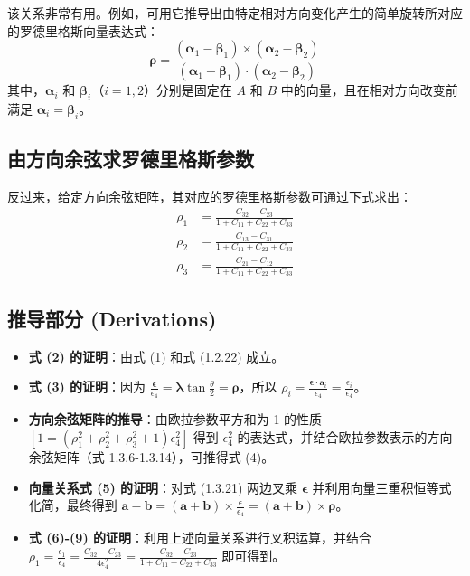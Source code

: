 该关系非常有用。例如，可用它推导出由特定相对方向变化产生的简单旋转所对应的罗德里格斯向量表达式：
\begin{equation}
\boldsymbol{\rho} = \frac{(\boldsymbol{\alpha}_1 - \boldsymbol{\beta}_1) \times (\boldsymbol{\alpha}_2 - \boldsymbol{\beta}_2)}{(\boldsymbol{\alpha}_1 + \boldsymbol{\beta}_1) \cdot (\boldsymbol{\alpha}_2 - \boldsymbol{\beta}_2)} \tag{6}
\end{equation}
其中，\(\boldsymbol{\alpha}_i\) 和 \(\boldsymbol{\beta}_i\)（\(i = 1, 2\)）分别是固定在 \(A\) 和 \(B\) 中的向量，且在相对方向改变前满足 \(\boldsymbol{\alpha}_i = \boldsymbol{\beta}_i\)。

\subsection*{由方向余弦求罗德里格斯参数}
反过来，给定方向余弦矩阵，其对应的罗德里格斯参数可通过下式求出：
\begin{align}
\rho_1 &= \frac{C_{32} - C_{23}}{1 + C_{11} + C_{22} + C_{33}} \tag{7} \\
\rho_2 &= \frac{C_{13} - C_{31}}{1 + C_{11} + C_{22} + C_{33}} \tag{8} \\
\rho_3 &= \frac{C_{21} - C_{12}}{1 + C_{11} + C_{22} + C_{33}} \tag{9}
\end{align}

\subsection*{推导部分 (Derivations)}
\begin{itemize}
    \item \textbf{式 (2) 的证明}：由式 (1) 和式 (1.2.22) 成立。
    \item \textbf{式 (3) 的证明}：因为 \(\frac{\boldsymbol{\epsilon}}{\epsilon_4} = \boldsymbol{\lambda} \tan \frac{\theta}{2} = \boldsymbol{\rho}\)，所以 \(\rho_i = \frac{\boldsymbol{\epsilon} \cdot \mathbf{a}_i}{\epsilon_4} = \frac{\epsilon_i}{\epsilon_4}\)。
    \item \textbf{方向余弦矩阵的推导}：由欧拉参数平方和为 1 的性质 \([1 = (\rho_1^2 + \rho_2^2 + \rho_3^2 + 1)\epsilon_4^2]\) 得到 \(\epsilon_4^2\) 的表达式，并结合欧拉参数表示的方向余弦矩阵（式 1.3.6-1.3.14），可推得式 (4)。
    \item \textbf{向量关系式 (5) 的证明}：对式 (1.3.21) 两边叉乘 \(\boldsymbol{\epsilon}\) 并利用向量三重积恒等式化简，最终得到 \(\mathbf{a} - \mathbf{b} = (\mathbf{a} + \mathbf{b}) \times \frac{\boldsymbol{\epsilon}}{\epsilon_4} = (\mathbf{a} + \mathbf{b}) \times \boldsymbol{\rho}\)。
    \item \textbf{式 (6)-(9) 的证明}：利用上述向量关系进行叉积运算，并结合 \(\rho_1 = \frac{\epsilon_1}{\epsilon_4} = \frac{C_{32} - C_{23}}{4\epsilon_4^2} = \frac{C_{32} - C_{23}}{1 + C_{11} + C_{22} + C_{33}}\) 即可得到。
\end{itemize}



